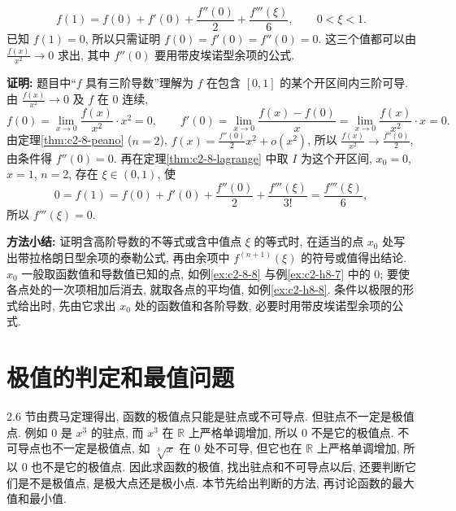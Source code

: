\documentclass[UTF8,openany]{ctexbook}
\theoremstyle{chinesetextbook}
\newenvironment{cnproof}{\par\indent\textbf{证明:} \ignorespaces}{\par}
\begin{document}
\[
f(1)=f(0)+f'(0)+\frac{f''(0)}2+\frac{f'''(\xi)}6,\qquad0<\xi<1.
\]
已知 $f(1)=0$, 所以只需证明 $f(0)=f'(0)=f''(0)=0$. 这三个值都可以由 $\displaystyle\frac{f(x)}{x^2}\to0$ 求出, 其中 $f''(0)$ 要用带皮埃诺型余项的公式.
\begin{cnproof}
题目中“$f$ 具有三阶导数”理解为 $f$ 在包含 $[0,1]$ 的某个开区间内三阶可导. 由 $\displaystyle\frac{f(x)}{x^2}\to0$ 及 $f$ 在 $0$ 连续,
\[
f(0)=\lim_{x\to0}\frac{f(x)}{x^2}\cdot x^2=0,\qquad f'(0)=\lim_{x\to0}\frac{f(x)-f(0)}x=\lim_{x\to0}\frac{f(x)}{x^2}\cdot x=0.
\]
由定理\ref{thm:c2-8-peano} ($n=2$), $\displaystyle f(x)=\frac{f''(0)}2x^2+o(x^2)$, 所以 $\displaystyle\frac{f(x)}{x^2}\to\frac{f''(0)}2$, 由条件得 $f''(0)=0$. 再在定理\ref{thm:c2-8-lagrange} 中取 $I$ 为这个开区间, $x_0=0$, $x=1$, $n=2$, 存在 $\xi\in(0,1)$, 使
\[
0=f(1)=f(0)+f'(0)+\frac{f''(0)}2+\frac{f'''(\xi)}{3!}=\frac{f'''(\xi)}6,
\]
所以 $f'''(\xi)=0$.
\end{cnproof}
\par\indent\textbf{方法小结:} 证明含高阶导数的不等式或含中值点 $\xi$ 的等式时, 在适当的点 $x_0$ 处写出带拉格朗日型余项的泰勒公式, 再由余项中 $f^{(n+1)}(\xi)$ 的符号或值得出结论. $x_0$ 一般取函数值和导数值已知的点, 如例\ref{ex:c2-8-8} 与例\ref{ex:c2-h8-7} 中的 $0$; 要使各点处的一次项相加后消去, 就取各点的平均值, 如例\ref{ex:c2-h8-8}. 条件以极限的形式给出时, 先由它求出 $x_0$ 处的函数值和各阶导数, 必要时用带皮埃诺型余项的公式.
\section{极值的判定和最值问题}
2.6 节由费马定理得出, 函数的极值点只能是驻点或不可导点. 但驻点不一定是极值点. 例如 $0$ 是 $x^3$ 的驻点, 而 $x^3$ 在 $\mathbb R$ 上严格单调增加, 所以 $0$ 不是它的极值点. 不可导点也不一定是极值点, 如 $\sqrt[3]x$ 在 $0$ 处不可导, 但它也在 $\mathbb R$ 上严格单调增加, 所以 $0$ 也不是它的极值点. 因此求函数的极值, 找出驻点和不可导点以后, 还要判断它们是不是极值点, 是极大点还是极小点. 本节先给出判断的方法, 再讨论函数的最大值和最小值.
\end{document}
